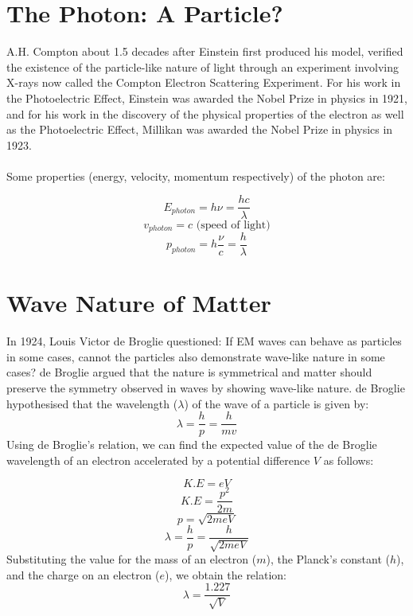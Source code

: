 \documentclass{article}
\begin{document}
\section{The Photon: A Particle?}
A.H. Compton about 1.5 decades after Einstein first produced his model, verified the existence of the particle-like nature of light through an experiment involving X-rays now called the Compton Electron Scattering Experiment. For his work in the Photoelectric Effect, Einstein was awarded the Nobel Prize in physics in 1921, and for his work in the discovery of the physical properties of the electron as well as the Photoelectric Effect, Millikan was awarded the Nobel Prize in physics in 1923. \\ \\
Some properties (energy, velocity, momentum respectively) of the photon are:

\begin{equation}
    E_{photon} = h \nu = \frac{hc}{\lambda}
\end{equation}
\begin{equation}
    v_{photon} = c \text{ (speed of light)}
\end{equation}
\begin{equation}
    p_{photon} = h \frac{\nu}{c} = \frac{h}{\lambda}
\end{equation}
\section{Wave Nature of Matter}
In 1924, Louis Victor de Broglie questioned: If EM waves can behave as particles in some cases, cannot the particles also demonstrate wave-like nature in some cases? de Broglie argued that the nature is symmetrical and matter should preserve the symmetry observed in waves by showing wave-like nature. de Broglie hypothesised that the wavelength ($\lambda$) of the wave of a particle is given by:
\begin{equation}
    \lambda = \frac{h}{p} = \frac{h}{mv}
\end{equation}
Using de Broglie's relation, we can find the expected value of the de Broglie wavelength of an electron accelerated by a potential difference $V$ as follows:

\begin{equation}
    K.E = eV 
\end{equation}
\begin{equation}
    K.E = \frac{p^{2}}{2m}
\end{equation}
\begin{equation}
    p = \sqrt{2meV}
\end{equation}
\begin{equation}
    \lambda = \frac{h}{p} = \frac{h}{\sqrt{2meV}}
\end{equation}
Substituting the value for the mass of an electron ($m$), the Planck's constant ($h$), and the charge on an electron ($e$), we obtain the relation:
\begin{equation}
    \lambda = \frac{1.227}{\sqrt{V}}
\end{equation}
\end{document}
